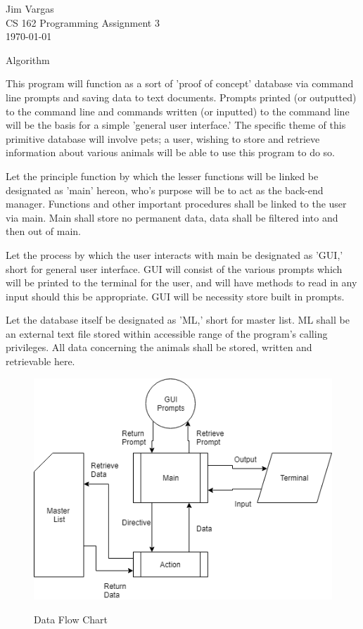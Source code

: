 \documentclass[12]{article}
\begin{document}
\noindent
\onehalfspacing
Jim Vargas \\
CS 162 Programming Assignment 3 \\
\today \\
\begin{center}
Algorithm
\end{center}

	This program will function as a sort of 'proof of concept' database via command line prompts and saving data to text documents. Prompts printed (or outputted) to the command line and commands written (or inputted) to the command line will be the basis for a simple 'general user interface.' The specific theme of this primitive database will involve pets; a user, wishing to store and retrieve information about various animals will be able to use this program to do so.
	
	Let the principle function by which the lesser functions will be linked be designated as 'main' hereon, who's purpose will be to act as the back-end manager. Functions and other important procedures shall be linked to the user via main. Main shall store no permanent data, data shall be filtered into and then out of main.
		
	Let the process by which the user interacts with main be designated as 'GUI,' short for general user interface. GUI will consist of the various prompts which will be printed to the terminal for the user, and will have methods to read in any input should this be appropriate. GUI will be necessity store built in prompts.
	
	Let the database itself be designated as 'ML,' short for master list. ML shall be an external text file stored within accessible range of the program's calling privileges. All data concerning the animals shall be stored, written and retrievable here.
	
\begin{figure}[h]
\centering
\includegraphics[scale=.8]{data_chart.png}\\
\caption{Data Flow Chart} 
\label{fig:fig1}
\end{figure}
\end{document}
